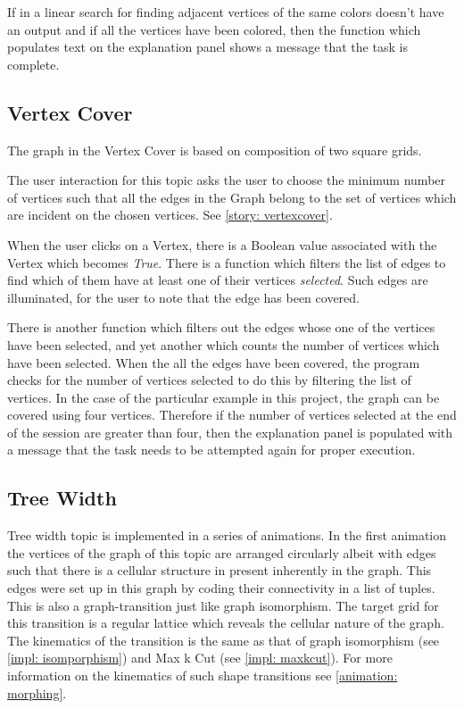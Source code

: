If in a linear search for finding adjacent vertices of the same colors
doesn't have an output and if all the vertices have been colored, then
the function which populates text on the explanation panel shows a message that
the task is complete.

\subsection{Vertex Cover}

The graph in the Vertex Cover is based on composition of two square grids.

The user interaction for this topic asks the user to choose the minimum number
of vertices such that all the edges in the Graph belong to the set of vertices
which are incident on the chosen vertices. See \autoref{story: vertexcover}.

When the user clicks on a Vertex, there is a Boolean value associated with the
Vertex which becomes \emph{True}. There is a function which filters
the list of edges to find which of them have at least one of their vertices
\emph{selected}. Such edges are illuminated, for the user to note that the edge has
been covered.

There is another function which filters out the edges whose one of the vertices
have been selected, and yet another which counts the number of vertices which
have been selected.  When the all the edges have been covered, the program
checks for the number of vertices selected to do this by filtering the list of
vertices. In the case of the particular example in this project, the graph can
be covered using four vertices. Therefore if the number of vertices selected at
the end of the session are greater than four, then the explanation panel is
populated with a message that the task needs to be attempted again for proper
execution.

\subsection{Tree Width}
Tree width topic is implemented in a series of animations.  In the first
animation the vertices of the graph of this topic are arranged circularly
albeit with edges such that there is a cellular structure in present inherently
in the graph. This edges were set up in this graph by coding their connectivity
in a list of tuples.
This is also a graph-transition just like graph isomorphism. The target grid
for this transition is a regular lattice which reveals the cellular nature of
the graph. The kinematics of the transition is the same as that of graph
isomorphism (see \autoref{impl: isomporphism}) and Max k Cut (see
\autoref{impl: maxkcut}). For more information on the kinematics of such shape
transitions see \autoref{animation: morphing}.

